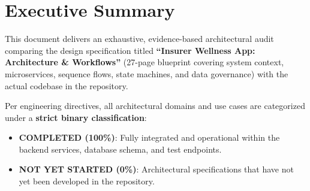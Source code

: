 \documentclass[11pt,a4paper]{article}
\begin{document}
\tableofcontents
\newpage

\section{Executive Summary}

This document delivers an exhaustive, evidence-based architectural audit comparing the design specification titled \textbf{``Insurer Wellness App: Architecture \& Workflows''} (27-page blueprint covering system context, microservices, sequence flows, state machines, and data governance) with the actual codebase in the repository.

Per engineering directives, all architectural domains and use cases are categorized under a \textbf{strict binary classification}:
\begin{itemize}[leftmargin=1.5em]
    \item \textcolor{statuscompleted}{\textbf{COMPLETED (100\%)}}: Fully integrated and operational within the backend services, database schema, and test endpoints.
    \item \textcolor{statusnotstarted}{\textbf{NOT YET STARTED (0\%)}}: Architectural specifications that have not yet been developed in the repository.
\end{itemize}
\end{document}
